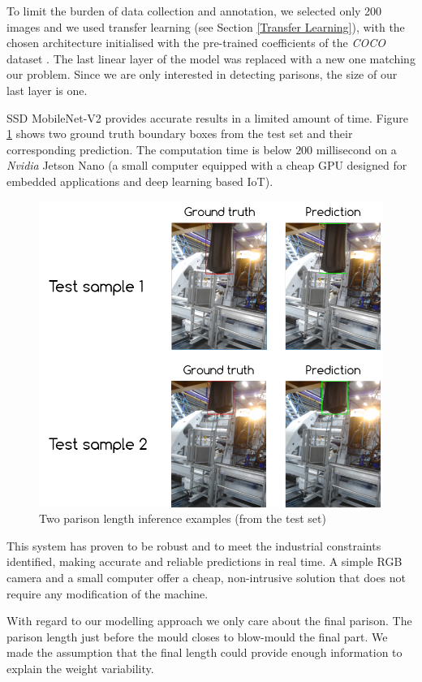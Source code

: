 To limit the burden of data collection and annotation, we selected only  200 images and we used transfer learning (see Section \ref{Transfer Learning}), with the chosen architecture initialised with the pre-trained coefficients of the \textit{COCO} dataset \citep{lin2014microsoft}. The last linear layer of the model was replaced with a new one matching our problem. Since we are only interested in detecting parisons, the size of our last layer is one.  

SSD MobileNet-V2 provides accurate results in a limited amount of time. Figure \ref{fig:parison_inference} shows two ground truth boundary boxes from the test set and their corresponding prediction. The computation time is below $200$ millisecond on a \textit{Nvidia} Jetson Nano (a small computer equipped with a cheap GPU designed for embedded applications and deep learning based IoT). 
%
\begin{figure}
\centerline{\includegraphics[scale=0.8]{images/chapter_3/parison_length_gt_prediction.png}}
\caption{Two parison length inference examples (from the test set)}
\label{fig:parison_inference}
\end{figure}
%
This system has proven to be robust and to meet the  industrial constraints identified, making accurate and reliable predictions in real time. A simple RGB camera and a small computer offer a cheap, non-intrusive solution that does not require any modification of the machine. 

With regard to our modelling approach we only care about the final parison. The parison length just before the mould closes to blow-mould the final part. We made the assumption that the final length could provide enough information to explain the weight variability.

